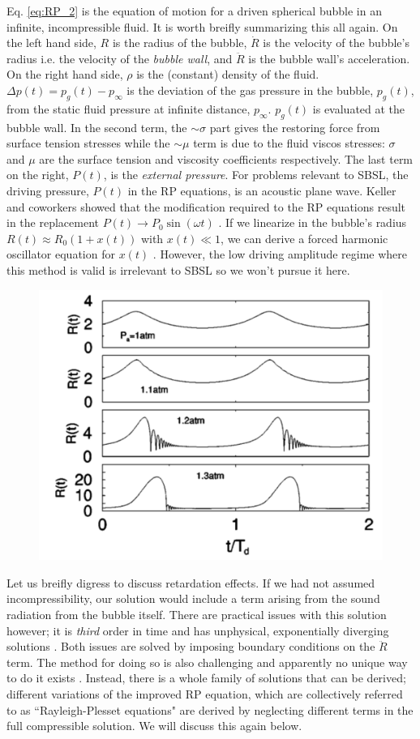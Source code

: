 \documentclass[rmp,aps,nofootinbib,superscriptaddress,floatfix]{revtex4-2}
\begin{document}
Eq. \ref{eq:RP_2} is the equation of motion for a driven spherical bubble in an infinite, incompressible fluid. It is worth breifly summarizing this all again. On the left hand side, $R$ is the radius of the bubble, $\dot{R}$ is the velocity of the bubble's radius i.e. the velocity of the \emph{bubble wall}, and $\ddot{R}$ is the bubble wall's acceleration. On the right hand side, $\rho$ is the (constant) density of the fluid. $\Delta p(t) = p_g(t)-p_\infty$ is the deviation of the gas pressure in the bubble, $p_g(t)$, from the static fluid pressure at infinite distance, $p_\infty$. $p_g(t)$ is evaluated at the bubble wall. In the second term, the $\sim \sigma$ part gives the restoring force from surface tension stresses while the $\sim \mu$ term is due to the fluid viscos stresses: $\sigma$ and $\mu$ are the surface tension and viscosity coefficients respectively. The last term on the right, $P(t)$, is the \emph{external pressure}. For problems relevant to SBSL, the driving pressure, $P(t)$ in the RP equations, is an acoustic plane wave. Keller and coworkers showed that the modification required to the RP equations result in the replacement $P(t) \rightarrow P_0 \sin(\omega t)$ \cite{keller1980bubble}. If we linearize in the bubble's radius $R(t)\approx R_0 \left( 1+x(t) \right)$ with $x(t) \ll 1$, we can derive a forced harmonic oscillator equation for $x(t)$ \cite{brennen2014cavitation,yasui2018acoustic}. However, the low driving amplitude regime where this method is valid is irrelevant to SBSL so we won't pursue it here.

\begin{figure}
\includegraphics[width=0.5\linewidth]{figs/bubble_radius_2.pdf}
    \caption{\cite{brenner2002single}}
\label{fig:bubble_radius_2}
\end{figure}

Let us breifly digress to discuss retardation effects. If we had not assumed incompressibility, our solution would include a term arising from the sound radiation from the bubble itself. There are practical issues with this solution however; it is \emph{third} order in time and has unphysical, exponentially diverging solutions \cite{prosperetti1999old,brenner2002single,prosperetti1986bubble,lezzi1987bubble}. Both issues are solved by imposing boundary conditions on the $\ddot{R}$ term. The method for doing so is also challenging and apparently no unique way to do it exists \cite{prosperetti1986bubble,prosperetti1988nonlinear,keller1956damping}. Instead, there is a whole family of solutions that can be derived; different variations of the improved RP equation, which are collectively referred to as ``Rayleigh-Plesset equations" are derived by neglecting different terms in the full compressible solution. We will discuss this again below.
\end{document}
